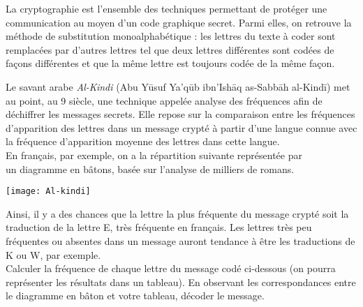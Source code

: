 \begin{enigme}[Cryptographie]
   La cryptographie est l'ensemble des techniques permettant de protéger une communication au moyen d'un code graphique secret. Parmi elles, on retrouve la méthode de substitution monoalphabétique : les lettres du texte à coder sont remplacées par d’autres lettres tel que  deux lettres différentes sont codées de façons différentes et que la même lettre est toujours codée de la même façon. \\
   \begin{minipage}{12cm}
      Le savant arabe {\it Al-Kindi}  (Abu Yūsuf Ya'qūb ibn'Ishāq as-Sabbāh al-Kindī) met au point, au 9 siècle, une technique appelée analyse des fréquences afin de déchiffrer les messages secrets. Elle repose sur la comparaison entre les fréquences d'apparition des lettres dans un message crypté à partir d'une langue connue avec la fréquence d'apparition moyenne des lettres dans cette langue. \\ [3mm]
      En français, par exemple, on a la répartition suivante représentée par \\
      un diagramme en bâtons, basée sur l'analyse de milliers de romans. 
   \end{minipage}
   \qquad
   \begin{minipage}{4cm}
      \texttt{[image: Al-kindi]}
   \end{minipage}
   \begin{center}
      {\footnotesize
   
      }
   \end{center}  
   Ainsi, il y a des chances que la lettre la plus fréquente du message crypté soit la traduction de la lettre E, très fréquente en français. Les lettres très peu fréquentes ou absentes dans un message auront tendance à être les traductions de K ou W, par exemple. \\

   Calculer la fréquence de chaque lettre du message codé ci-dessous (on pourra représenter les résultats dans un tableau). En observant les correspondances entre le diagramme en bâton et votre tableau, décoder le message.
   

\end{enigme}
